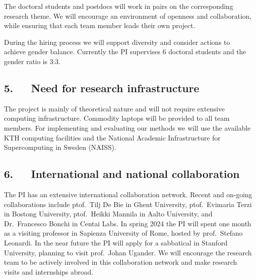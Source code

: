 \documentclass[a4paper,11pt]{article}
\begin{document}
The doctoral students and postdocs will work in pairs on the corresponding research theme.
We will encourage an environment of openness and collaboration, 
while ensuring that each team member leads their own project.

During the hiring process we will support diversity and consider actions to achieve gender balance. 
Currently the PI supervises 6 doctoral students and the gender ratio is 3:3.

\subsection*{5.~~~Need for research infrastructure}


The project is mainly of theoretical nature and will not require extensive computing infrastructure. 
Commodity laptops will be provided to all team members. 
For implementing and evaluating our methods we will use the available 
KTH computing facilities
and the National Academic Infrastructure for Supercomputing in Sweden (NAISS).

\subsection*{6.~~~International and national collaboration}


The PI has an extensive international collaboration network. 
Recent and on-going collaborations include
ptof.\ Tilj De Bie in Ghent University, 
ptof.\ Evimaria Terzi in Bostong University,
ptof.\ Heikki Mannila in Aalto University, and 
Dr.\ Francesco Bonchi in Centai Labs.
In spring 2024 the PI will spent one month as a visiting professor 
in Sapienza University of Rome, hosted by prof.\ Stefano Leonardi.
In the near future the PI will apply for a sabbatical in Stanford University, 
planning to visit prof.\ Johan Ugander. 
We will encourage the research team to be actively involved in this collaboration network
and make research visits and internships abroad.

{\footnotesize
\setlength{\bibsep}{0pt}


}

\newpage

\end{document}
